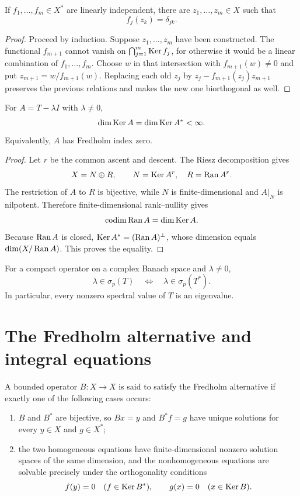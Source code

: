 \begin{notelemma}
If $f_1,\ldots,f_m\in X^*$ are linearly independent, there are
$z_1,\ldots,z_m\in X$ such that
\[
  f_j(z_k)=\delta_{jk}.
\]
\end{notelemma}

\begin{proof}
Proceed by induction.  Suppose $z_1,\ldots,z_m$ have been constructed.  The
functional $f_{m+1}$ cannot vanish on
$\bigcap_{j=1}^{m}\operatorname{Ker} f_j$, for otherwise it would be a linear combination
of $f_1,\ldots,f_m$.  Choose $w$ in that intersection with
$f_{m+1}(w)\ne0$ and put $z_{m+1}=w/f_{m+1}(w)$.  Replacing each old $z_j$ by
$z_j-f_{m+1}(z_j)z_{m+1}$ preserves the previous relations and makes the new
one biorthogonal as well.
\end{proof}

\begin{notetheorem}
For $A=T-\lambda I$ with $\lambda\ne0$,
\[
  \dim\operatorname{Ker} A=\dim\operatorname{Ker} A^*<\infty.
\]
Equivalently, $A$ has Fredholm index zero.
\end{notetheorem}

\begin{proof}
Let $r$ be the common ascent and descent.  The Riesz decomposition gives
\[
  X=N\oplus R,
  \qquad N=\operatorname{Ker} A^r,
  \quad R=\operatorname{Ran} A^r.
\]
The restriction of $A$ to $R$ is bijective, while $N$ is finite-dimensional
and $A|_N$ is nilpotent.  Therefore finite-dimensional rank--nullity gives
\[
  \operatorname{codim}\operatorname{Ran} A=\dim\operatorname{Ker} A.
\]
Because $\operatorname{Ran} A$ is closed,
$\operatorname{Ker} A^*=(\operatorname{Ran} A)^\perp$, whose dimension equals
$\dim(X/\operatorname{Ran} A)$.  This proves the equality.
\end{proof}

\begin{notecorollary}
For a compact operator on a complex Banach space and $\lambda\ne0$,
\[
  \lambda\in\sigma_p(T)
  \quad\Longleftrightarrow\quad
  \lambda\in\sigma_p(T^*).
\]
In particular, every nonzero spectral value of $T$ is an eigenvalue.
\end{notecorollary}

\section{The Fredholm alternative and integral equations}

\begin{notedefinition}
A bounded operator $B\colon X\to X$ is said to satisfy the Fredholm
alternative if exactly one of the following cases occurs:
\begin{enumerate}
  \item $B$ and $B^*$ are bijective, so $Bx=y$ and $B^*f=g$ have
        unique solutions for every $y\in X$ and $g\in X^*$;
  \item the two homogeneous equations have finite-dimensional nonzero
        solution spaces of the same dimension, and the nonhomogeneous
        equations are solvable precisely under the orthogonality conditions
        \[
          f(y)=0\quad(f\in\operatorname{Ker} B^*),
          \qquad
          g(x)=0\quad(x\in\operatorname{Ker} B).
        \]
\end{enumerate}
\end{notedefinition}

